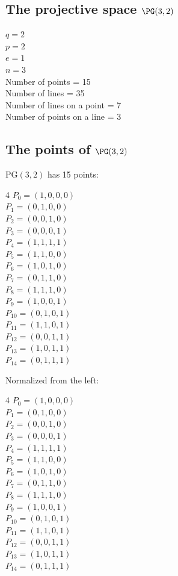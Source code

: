 \subsection*{The projective space ${\rm \PG}(3,2)$}
\noindent
\arraycolsep=2pt
\parindent=0pt
$q = 2$\\
$p = 2$\\
$e = 1$\\
$n = 3$\\
Number of points = 15\\
Number of lines = 35\\
Number of lines on a point = 7\\
Number of points on a line = 3\\
\subsection*{The points of ${\rm \PG}(3,2)$}
PG$(3, 2)$ has 15 points:\\
\begin{multicols}{4}
$P_{0}=( 1, 0, 0, 0 )$\\
$P_{1}=( 0, 1, 0, 0 )$\\
$P_{2}=( 0, 0, 1, 0 )$\\
$P_{3}=( 0, 0, 0, 1 )$\\
$P_{4}=( 1, 1, 1, 1 )$\\
$P_{5}=( 1, 1, 0, 0 )$\\
$P_{6}=( 1, 0, 1, 0 )$\\
$P_{7}=( 0, 1, 1, 0 )$\\
$P_{8}=( 1, 1, 1, 0 )$\\
$P_{9}=( 1, 0, 0, 1 )$\\
$P_{10}=( 0, 1, 0, 1 )$\\
$P_{11}=( 1, 1, 0, 1 )$\\
$P_{12}=( 0, 0, 1, 1 )$\\
$P_{13}=( 1, 0, 1, 1 )$\\
$P_{14}=( 0, 1, 1, 1 )$\\
\end{multicols}
Normalized from the left:\\
\begin{multicols}{4}
$P_{0}=( 1, 0, 0, 0 )$\\
$P_{1}=( 0, 1, 0, 0 )$\\
$P_{2}=( 0, 0, 1, 0 )$\\
$P_{3}=( 0, 0, 0, 1 )$\\
$P_{4}=( 1, 1, 1, 1 )$\\
$P_{5}=( 1, 1, 0, 0 )$\\
$P_{6}=( 1, 0, 1, 0 )$\\
$P_{7}=( 0, 1, 1, 0 )$\\
$P_{8}=( 1, 1, 1, 0 )$\\
$P_{9}=( 1, 0, 0, 1 )$\\
$P_{10}=( 0, 1, 0, 1 )$\\
$P_{11}=( 1, 1, 0, 1 )$\\
$P_{12}=( 0, 0, 1, 1 )$\\
$P_{13}=( 1, 0, 1, 1 )$\\
$P_{14}=( 0, 1, 1, 1 )$\\
\end{multicols}

